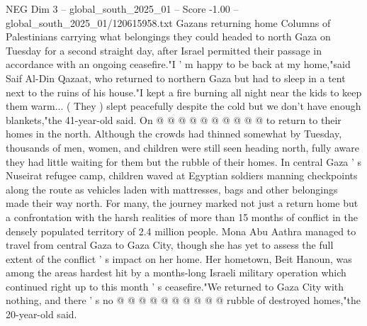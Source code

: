 \begin{textsample}{NEG Dim 3 – global\_south\_2025\_01 – Score -1.00 – global\_south\_2025\_01/120615958.txt}
Gazans returning home Columns of Palestinians carrying what belongings they could headed to north Gaza on Tuesday for a second straight day, after Israel permitted their passage in accordance with an ongoing ceasefire."I ' m happy to be back at my home,"said Saif Al-Din Qazaat, who returned to northern Gaza but had to sleep in a tent next to the ruins of his house."I kept a fire burning all night near the kids to keep them warm... ( They ) slept peacefully despite the cold but we don't have enough blankets,"the 41-year-old said.
On @ @ @ @ @ @ @ @ @ @ to return to their homes in the north.
Although the crowds had thinned somewhat by Tuesday, thousands of men, women, and children were still seen heading north, fully aware they had little waiting for them but the rubble of their homes.
In central Gaza ' s Nuseirat refugee camp, children waved at Egyptian soldiers manning checkpoints along the route as vehicles laden with mattresses, bags and other belongings made their way north.
For many, the journey marked not just a return home but a confrontation with the harsh realities of more than 15 months of conflict in the densely populated territory of 2.4 million people.
Mona Abu Aathra managed to travel from central Gaza to Gaza City, though she has yet to assess the full extent of the conflict ' s impact on her home.
Her hometown, Beit Hanoun, was among the areas hardest hit by a months-long Israeli military operation which continued right up to this month ' s ceasefire."We returned to Gaza City with nothing, and there ' s no @ @ @ @ @ @ @ @ @ @ rubble of destroyed homes,"the 20-year-old said.

\end{textsample}
